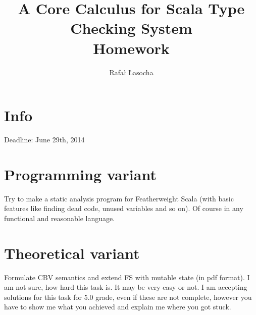 \documentclass[a4paper,11pt]{article}
\title{
  \textbf{A Core Calculus for Scala Type Checking System}\\
  {\Large Homework}
}
\author{Rafał Łasocha}
\begin{document}
\maketitle
\section{Info}
Deadline: June 29th, 2014

\section{Programming variant}
Try to make a static analysis program for Featherweight Scala (with basic features like finding dead code, unused variables and so on). Of course in any functional and reasonable language.

\section{Theoretical variant}
Formulate CBV semantics and extend FS with mutable state (in pdf format).
I am not sure, how hard this task is. It may be very easy or not.
I am accepting solutions for this task for 5.0 grade, even if these are not complete, however you have to show me what you achieved and explain me where you got stuck.
\end{document}
